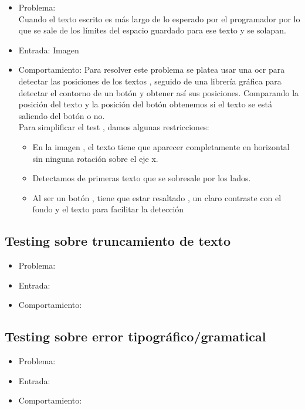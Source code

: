 \begin{itemize}
	\item Problema: \\
	Cuando el texto escrito es más largo de lo esperado por el programador por lo que se sale de los límites del espacio guardado para ese texto y se solapan. \\
	\item Entrada: Imagen\\
	
	\item Comportamiento: Para resolver este problema se platea usar una ocr para detectar las posiciones de los textos , seguido de una librería gráfica para detectar el contorno de un botón y obtener así sus posiciones. Comparando la posición del texto y la posición del botón obtenemos si el texto se está saliendo del botón o no.\\
	Para simplificar el test , damos algunas restricciones: 
	\begin{itemize}
		\item En la imagen , el texto tiene que aparecer completamente en horizontal sin ninguna rotación sobre el eje x.
		\item Detectamos de primeras texto que se sobresale por los lados.
		\item Al ser un botón , tiene que estar resaltado , un claro contraste con el fondo y el texto para facilitar la detección
	\end{itemize} 
	
\end{itemize}
\subsection{Testing sobre truncamiento de texto
}
\begin{itemize}
	\item Problema: \\
	
	\item Entrada: \\
	
	\item Comportamiento: \\
	
\end{itemize}
\subsection{Testing sobre error tipográfico/gramatical
}
\begin{itemize}
	\item Problema: \\
	
	\item Entrada: \\
	
	\item Comportamiento: \\
	
\end{itemize}
 

